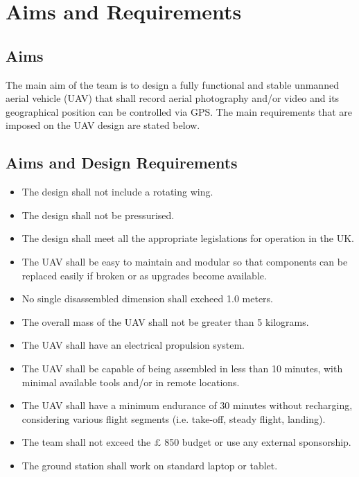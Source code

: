 \documentclass[12pt]{article}
\begin{document}


\tableofcontents

\newpage

\section{Aims and Requirements}

\subsection{Aims}

\noindent The main aim of the team is to design a fully functional and stable unmanned aerial vehicle (UAV) that shall record aerial photography and/or video and its geographical position can be controlled via GPS. The main requirements that are imposed on the UAV design are stated below. \\

\subsection{Aims and Design Requirements}

\begin{itemize}
    \item The design shall not include a rotating wing.
    \item The design shall not be pressurised.
    \item The design shall meet all the appropriate legislations for operation in the UK.
    \item The UAV shall be easy to maintain and modular so that components can be replaced easily if broken or as upgrades become available.
    \item No single disassembled dimension shall excheed 1.0 meters. 
    \item The overall mass of the UAV shall not be greater than 5 kilograms. 
    \item The UAV shall have an electrical propulsion system.
    \item The UAV shall be capable of being assembled in less than 10 minutes, with minimal available tools and/or in remote locations.
    \item The UAV shall have a minimum endurance of 30 minutes without recharging, considering various flight segments (i.e. take-off, steady flight, landing).
    \item The team shall not exceed the $\pounds$ 850 budget or use any external sponsorship. 
    \item The ground station shall work on standard laptop or tablet.
\end{itemize}
\end{document}
